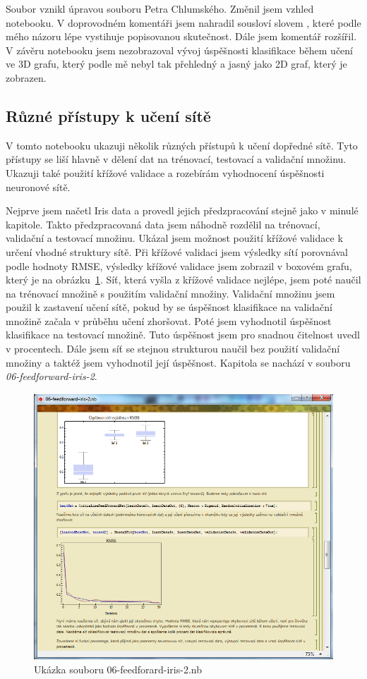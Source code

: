 \documentclass[11pt,twoside,a4paper]{book}
\begin{document}
Soubor vznikl úpravou souboru Petra Chlumského.\cite{chlumsky} Změnil jsem vzhled notebooku. V doprovodném komentáři jsem nahradil sousloví  slovem , které podle mého názoru lépe vystihuje popisovanou skutečnost. Dále jsem komentář rozšířil. V závěru notebooku jsem nezobrazoval vývoj úspěšnosti klasifikace během učení ve 3D grafu, který podle mě nebyl tak přehledný a jasný jako 2D graf, který je zobrazen.

\subsection{Různé přístupy k učení sítě}
V tomto notebooku ukazuji několik různých přístupů k učení dopředné sítě. Tyto přístupy se liší hlavně v dělení dat na trénovací, testovací a validační množinu. Ukazuji také použití křížové validace a rozebírám vyhodnocení úspěšnosti neuronové sítě.

Nejprve jsem načetl Iris data a provedl jejich předzpracování stejně jako v minulé kapitole. Takto předzpracovaná data jsem náhodně rozdělil na trénovací, validační a testovací množinu. Ukázal jsem možnost použití křížové validace k určení vhodné struktury sítě. Při křížové validaci jsem výsledky sítí porovnával podle hodnoty RMSE, výsledky křížové validace jsem zobrazil v boxovém grafu, který je na obrázku~\ref{fig:feedforward-iris-2}. Síť, která vyšla z křížové validace nejlépe, jsem poté naučil na trénovací množině s použitím validační množiny. Validační množinu jsem použil k zastavení učení sítě, pokud by se úspěšnost klasifikace na validační množině začala v průběhu učení zhoršovat. Poté jsem vyhodnotil úspěšnost klasifikace na testovací množině. Tuto úspěšnost jsem pro snadnou čitelnost uvedl v procentech. Dále jsem síť se stejnou strukturou naučil bez použití validační množiny a taktéž jsem vyhodnotil její úspěšnost. Kapitola se nachází v souboru \textit{06-feedforward-iris-2}.

\begin{figure}[h!]
\begin{center}
\includegraphics[height=10cm]{figures/ukazka06.png}
\caption{Ukázka souboru 06-feedforard-iris-2.nb}
\label{fig:feedforward-iris-2}
\end{center}
\end{figure}
\end{document}
